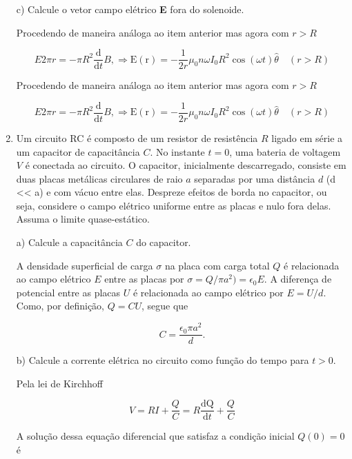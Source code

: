 \begin{enumerate}[start=1,label={\bfseries Q\arabic*.}]
c) Calcule o vetor campo elétrico \textbf{E} fora do solenoide.

Procedendo de maneira análoga ao item anterior mas agora com $r > R$

$$
E 2 \pi r=-\pi R^{2} \frac{\mathrm{d}}{\mathrm{d} t} B, \Rightarrow \mathrm{E}(\mathrm{r})=-\frac{1}{2 r} \mu_{0} n \omega I_{0} R^{2} \cos (\omega t) \hat{\theta} \quad(r>R)
$$

\resposta

Procedendo de maneira análoga ao item anterior mas agora com $r > R$

$$
E 2 \pi r=-\pi R^{2} \frac{\mathrm{d}}{\mathrm{d} t} B, \Rightarrow \mathrm{E}(\mathrm{r})=-\frac{1}{2 r} \mu_{0} n \omega I_{0} R^{2} \cos (\omega t) \hat{\theta} \quad(r>R)
$$








\item Um circuito RC é composto de um resistor de resistência $R$ ligado em série a um capacitor de capacitância $C$. No instante $t = 0$, uma bateria de voltagem $V$ é conectada ao circuito. O capacitor, inicialmente descarregado, consiste em duas placas metálicas circulares de raio $a$ separadas por uma distância $d$ (d << a) e com vácuo entre elas. Despreze efeitos de borda no capacitor, ou seja, considere o campo elétrico uniforme entre as placas e nulo fora delas. Assuma o limite quase-estático.



a) Calcule a capacitância $C$ do capacitor.

\resposta

A densidade superficial de carga $\sigma$ na placa com carga total $Q$ é relacionada ao campo elétrico $E$ entre as placas por $\sigma = Q/ \pi a^{2}) = \epsilon_{0} E$. A diferença de potencial entre as placas $U$ é relacionada ao campo elétrico por $E = U / d$. Como, por definição, $Q = CU$, segue que

$$
C=\frac{\epsilon_{0} \pi a^{2}}{d}.
$$



b) Calcule a corrente elétrica no circuito como função do tempo para $t > 0$.

\resposta

Pela lei de Kirchhoff

$$
V=R I+\frac{Q}{C}=R \frac{\mathrm{d} \mathrm{Q}}{\mathrm{d} t}+\frac{Q}{C}
$$

A solução dessa equação diferencial que satisfaz a condição inicial $Q(0) = 0$ é


\end{enumerate}
